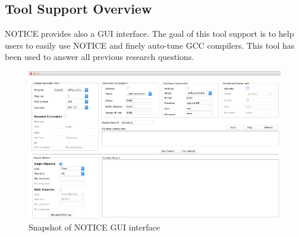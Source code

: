 		
\subsection{Tool Support Overview}


NOTICE provides also a GUI interface. The goal of this tool support is to help users to easily use NOTICE and finely auto-tune GCC compilers. This tool has been used to answer all previous research questions.

\begin{figure}[h]
	\center
	\includegraphics[scale=0.65]{chapitre3/fig/tool_support}
	\caption{Snapshot of NOTICE GUI interface}
	\label{fig:tool_support}
\end{figure}


